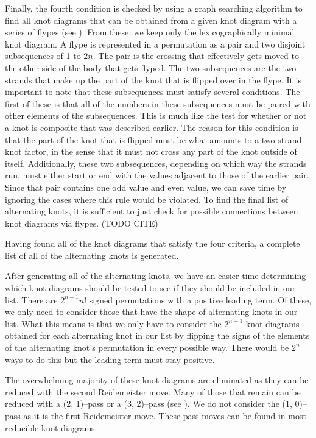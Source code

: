 \begin{paper}
Finally, the fourth condition is checked by using a graph searching algorithm to
find all knot diagrams that can be obtained from a given knot diagram with a
series of flypes (see \figMoves).
From these, we keep only the lexicographically minimal knot diagram.
A flype is represented in a permutation as a pair and two disjoint subsequences
of 1 to $2n$.
The pair is the crossing that effectively gets moved to the other side of the
body that gets flyped.
The two subsequences are the two strands that make up the part of the knot that
is flipped over in the flype.
It is important to note that these subsequences must satisfy several conditions.
The first of these is that all of the numbers in these subsequences must be
paired with other elements of the subsequences.
This is much like the test for whether or not a knot is composite that was
described earlier.
The reason for this condition is that the part of the knot that is flipped must
be what amounts to a two strand knot factor, in the sense that it must not cross
any part of the knot outside of itself.
Additionally, these two subsequences, depending on which way the strands run,
must either start or end with the values adjacent to those of the earlier pair.
Since that pair contains one odd value and even value, we can save time by
ignoring the cases where this rule would be violated.
To find the final list of alternating knots, it is sufficient to just check for
possible connections between knot diagrams via flypes. (TODO CITE)


Having found all of the knot diagrams that satisfy the four criteria, a complete
list of all of the alternating knots is generated.



After generating all of the alternating knots, we have an easier time
determining which knot diagrams should be tested to see if they should be
included in our list.
There are $2^{n-1}n!$ signed permutations with a positive leading term.
Of these, we only need to consider those that have the shape of alternating
knots in our list.
What this means is that we only have to consider the $2^{n-1}$ knot diagrams
obtained for each alternating knot in our list by flipping the signs of the
elements of the alternating knot's permutation in every possible way.
There would be $2^n$ ways to do this but the leading term must stay positive.

The overwhelming majority of these knot diagrams are eliminated as they can be
reduced with the second Reidemeister move.
Many of those that remain can be reduced with a (2, 1)--pass or a (3, 2)--pass
(see \figMoves).
We do not consider the (1, 0)--pass as it is the first Reidemeister move.
These pass moves can be found in most reducible knot diagrams.


\end{paper}
